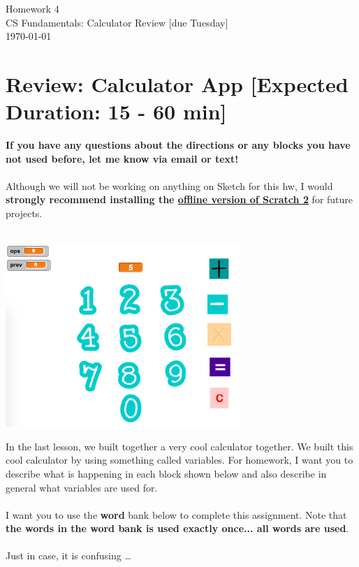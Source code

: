 \documentclass[11pt]{article}
\newcommand{\myhwname}{Homework 4}
\newcommand{\mysection}{CS Fundamentals: Calculator Review [due Tuesday]}
\begin{document}
\begin{center}
    {\Large \myhwname} \\
    \mysection \\
    \today
\end{center}

\section{Review: Calculator App [Expected Duration: 15 - 60 min]}
\textbf{If you have any questions about the directions or any blocks you have not used before, let me know via email or text!}\\\\
Although we will not be working on anything on Sketch for this hw, I would \textbf{strongly recommend installing the \href{https://scratch.mit.edu/scratch2download/}{offline version of Scratch 2}} for future projects.\\
\noindent\makebox[\linewidth]{\rule{\paperwidth}{0.4pt}}\\
\begin{center}
  \includegraphics[width=3.5in]{preview.png}
 \end{center}
In the last lesson, we built together a very cool calculator together. 
We built this cool calculator by using something called variables. 
For homework, I want you to describe what is happening in each block shown below and also describe in general what variables are used for.\\\\ 
I want you to use the \textbf{word} bank below to complete this assignment. 
Note that \textbf{the words in the word bank is used exactly once... all words are used}.\\\\
Just in case, it is confusing \dots\\
\end{document}
